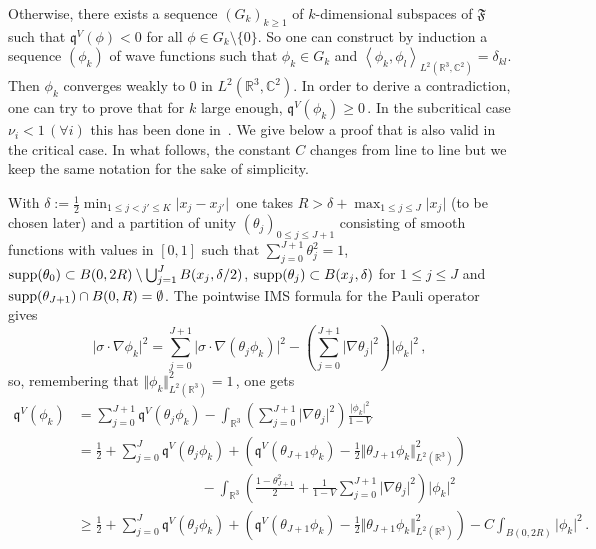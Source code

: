 \documentclass[12pt,reqno]{amsart}
\newcommand{\innerproduct}[2]{\left\langle #1, #2 \right\rangle}
\newcommand{\R}{{\mathbb R}}
\newcommand{\C}{{\mathbb C}}
\renewcommand{\(}{\left(}
\renewcommand{\)}{\right)}
\begin{document}
\noindent
Otherwise, there exists a sequence $(G_k)_{k\geq 1}$ of $k$-dimensional subspaces of $\mathfrak{F}$ such that $\mathfrak{q}^V(\phi)<0$ for all $\phi\in G_k\setminus\{0\}$. So one can construct by induction a sequence $(\phi_k)$ of wave functions such that $\phi_k\in G_k$ and $\innerproduct{\phi_k}{\phi_l}_{L^2(\R^3,\C^2)}=\delta_{kl}$. Then $\phi_k$ converges weakly to $0$ in $L^2(\R^3,\C^2)$. In order to derive a contradiction, one can try to prove that for $k$ large enough, $\mathfrak{q}^V(\phi_k)\geq 0\,$. In the subcritical case $\nu_i<1\,(\forall i)$ this has been done in~\cite[Section 6, Step 4, p. 1448-1449]{ELS21}. We give below a proof that is also valid in the critical case. In what follows, the constant $C$ changes from line to line but we keep the same notation for the sake of simplicity.

\noindent
With $\delta:=\frac{1}{2}\min_{1\leq j<j'\leq K} \vert x_j-x_{j'}\vert\,$ one takes $R>\delta +\max_{1\leq j \leq J} \vert x_j\vert$ (to be chosen later) and a partition of unity $(\theta_j)_{0\leq j\leq J+1}$
consisting of smooth functions with values in $[0,1]$ such that $\sum_{j=0}^{J+1} \theta_j^2=1$, ${\rm supp}(\theta_0)\subset B(0,2R)\setminus\bigcup_{j=1}^JB(x_j,\delta/2)$, ${\rm supp}(\theta_j)\subset B(x_j,\delta)$ for $1\leq j\leq J$ and ${\rm supp}(\theta_{J+1})\cap B(0,R)=\emptyset$.
The pointwise IMS formula \cite[Lemma 4.1]{bosi} for the Pauli operator gives
\[\vert\sigma\cdot\nabla\phi_k\vert^2=\sum_{j=0}^{J+1}\vert\sigma\cdot\nabla(\theta_j\phi_k)\vert^2-\left(\sum_{j=0}^{J+1}\vert\nabla \theta_j\vert^2\right)\vert\phi_k\vert^2\,,
\]
so, remembering that $\Vert\phi_k\Vert_{L^2(\R^3)}^2=1\,$, one gets
\begin{align*}
\mathfrak{q}^V(\phi_k)&=\sum_{j=0}^{J+1}\mathfrak{q}^V(\theta_j\phi_k)-\int_{\R^3} \left(\sum_{j=0}^{J+1}\vert\nabla \theta_j\vert^2\right)\frac{\vert\phi_k\vert^2}{1-V}\\
&=\frac{1}{2}+\sum_{j=0}^J\mathfrak{q}^V(\theta_j\phi_k)+\left(\mathfrak{q}^V(\theta_{J+1}\phi_k)-\frac{1}{2}\Vert\theta_{J+1}\phi_k\Vert_{L^2(\R^3)}^2\right)\\
&\qquad\qquad\qquad\qquad\;\;\; -\int_{\R^3} \left(\frac{1-\theta_{J+1}^2}{2}+\frac{1}{1-V}\sum_{j=0}^{J+1}\vert\nabla \theta_j\vert^2\right)\vert\phi_k\vert^2\\
&\geq \frac{1}{2}+\sum_{j=0}^{J}\mathfrak{q}^V(\theta_j\phi_k)+\left(\mathfrak{q}^V(\theta_{J+1}\phi_k)-\frac{1}{2}\Vert\theta_{J+1}\phi_k\Vert_{L^2(\R^3)}^2\right) -C\int_{B(0,2R)}\vert\phi_k\vert^2\,.
\end{align*}
\end{document}
